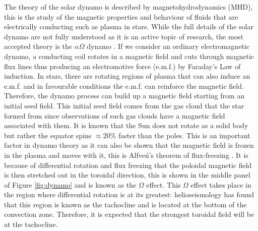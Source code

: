 The theory of the solar dynamo is described by magnetohydrodynamics (MHD), this is the study of the magnetic properties and behaviour of fluids that are electrically conducting such as plasma in stars. While the full details of the solar dynamo are not fully understood as it is an active topic of research, the most accepted theory is the $\alpha\Omega$ dynamo \citep{Choudhuri_2007}. If we consider an ordinary electromagnetic dynamo, a conducting coil rotates in a magnetic field and cuts through magnetic flux lines thus producing an electromotive force (e.m.f.) by Faraday's Law of induction. In stars, there are rotating regions of plasma that can also induce an e.m.f. and in favourable conditions the e.m.f. can reinforce the magnetic field. Therefore, the dynamo process can build up a magnetic field starting from an initial seed field. This initial seed field comes from the gas cloud that the star formed from since observations of such gas clouds have a magnetic field associated with them. It is known that the Sun does not rotate as a solid body but rather the equator spins $\approx 20 \%$ faster than the poles. This is an important factor in dynamo theory as it can also be shown that the magnetic field is frozen in the plasma and moves with it, this is Alfve\'n's theorem of flux-freezing \citep{Alfven_1942}. It is because of differential rotation and flux freezing that the poloidal magnetic field is then stretched out in the toroidal direction, this is shown in the middle panel of Figure \ref{fig:dynamo} and is known as the $\Omega$ effect. This $\Omega$ effect takes place in the region where differential rotation is at its greatest: helioseismology has found that this region is known as the tachocline and is located at the bottom of the convection zone. Therefore, it is expected that the strongest toroidal field will be at the tachocline.

